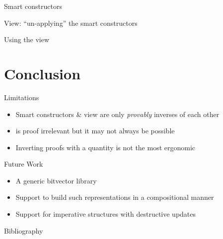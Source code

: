 \documentclass{beamer}
\begin{document}
\begin{frame}{Smart constructors}

\end{frame}

\begin{frame}{View: ``un-applying'' the smart constructors}

\end{frame}

\begin{frame}{Using the view}
\end{frame}


\section{Conclusion}

\begin{frame}{Limitations}
\begin{itemize}
  \item Smart constructors \& view are only \emph{provably} inverses of each other
  \item {} is proof irrelevant but it may not always be possible
  \item Inverting proofs with a  quantity is not the most ergonomic
\end{itemize}
\end{frame}

\begin{frame}{Future Work}
\begin{itemize}
  \item A generic bitvector library
  \item Support to build such representations in a compositional manner
  \item Support for imperative structures with destructive updates
\end{itemize}
\end{frame}



\begin{frame}{Bibliography}

\end{frame}
\end{document}
